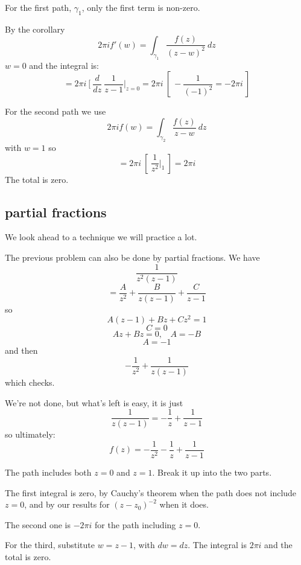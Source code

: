 \documentclass[11pt, oneside]{article}
\begin{document}
For the first path, $\gamma_1$, only the first term is non-zero.

By the corollary
\[ 2 \pi i f'(w) =  \int_{\gamma_1} \frac{f(z)}{(z - w)^2} \ dz \]
$w = 0$ and the integral is:
\[ = 2 \pi i \ [ \ \frac{d}{dz} \ \frac{1}{z -1} \bigg |_{z=0} = 2 \pi i \ [ \  - \frac{1}{(-1)^2} = -2 \pi i \ ] \]

For the second path we use
\[ 2 \pi i f(w) =  \int_{\gamma_2} \frac{f(z)}{z - w} \ dz \]
with $w = 1$ so
\[ = 2 \pi i \ [ \  \frac{1}{z^2} \bigg |_1 \ ] = 2 \pi i \]
The total is zero.

\subsection*{partial fractions}
We look ahead to a technique we will practice a lot.

The previous problem can also be done by partial fractions.  We have
\[ \frac{1}{z^2(z - 1)} \]
\[ = \frac{A}{z^2} + \frac{B}{z(z-1)} + \frac{C}{z - 1} \]
so
\[ A(z-1) + Bz + Cz^2 = 1 \]
\[ C = 0 \]
\[ Az + Bz = 0, \ \ \ \ A = -B \]
\[ A = -1 \]
and then
\[ -\frac{1}{z^2} + \frac{1}{z(z - 1)} \]
which checks.

We're not done, but what's left is easy, it is just
\[ \frac{1}{z(z - 1)} = -\frac{1}{z} + \frac{1}{z - 1} \]
so ultimately:
\[ f(z) = -\frac{1}{z^2} -\frac{1}{z} + \frac{1}{z - 1} \]

The path includes both $z = 0$ and $z = 1$.  Break it up into the two parts.

The first integral is zero, by Cauchy's theorem when the path does not include $z = 0$, and by our results for $(z-z_0)^{-2}$ when it does.

The second one is $-2\pi i$ for the path including $z = 0$.

For the third, substitute $w = z - 1$, with $dw = dz$.  The integral is $2 \pi i$ and the total is zero.
\end{document}
